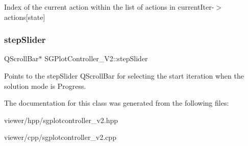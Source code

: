Index of the current action within the list of actions in current\+Iter-\/$>$actions\mbox{[}state\mbox{]} \mbox{\label{classSGPlotController__V2_a3524cbb0ad2dad23c0d2fa09dc2ab9f0}} 
\subsubsection{\texorpdfstring{step\+Slider}{stepSlider}}
{\footnotesize\ttfamily Q\+Scroll\+Bar$\ast$ S\+G\+Plot\+Controller\+\_\+\+V2\+::step\+Slider\hspace{0.3cm}{\ttfamily [private]}}

Points to the step\+Slider Q\+Scroll\+Bar for selecting the start iteration when the solution mode is Progress. 

The documentation for this class was generated from the following files\+:\begin{DoxyCompactItemize}
\item 
viewer/hpp/sgplotcontroller\+\_\+v2.\+hpp\item 
viewer/cpp/sgplotcontroller\+\_\+v2.\+cpp\end{DoxyCompactItemize}
